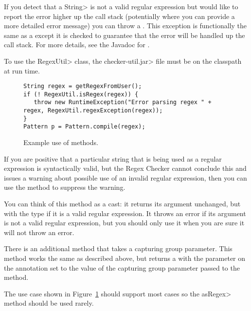 \begin{sloppypar}
If you detect that a \<String> is not a valid regular expression but would like
to report the error higher up the call stack (potentially where you can
provide a more detailed error message) you can throw a
. This exception is
functionally the same as a
except it is checked to guarantee that the error will be handled up the
call stack.  For more details, see the Javadoc for
.
\end{sloppypar}

To use the \<RegexUtil> class, the \<checker-util.jar> file
must be on the classpath at run time.

\begin{figure}
\begin{smaller}
\begin{Verbatim}
String regex = getRegexFromUser();
if (! RegexUtil.isRegex(regex)) {
   throw new RuntimeException("Error parsing regex " + regex, RegexUtil.regexException(regex));
}
Pattern p = Pattern.compile(regex);
\end{Verbatim}
\end{smaller}
\caption{Example use of  methods.}
\label{fig-regex-util-example}
\end{figure}


If you are positive that a particular string that is being used as a
regular expression is syntactically valid, but the Regex Checker cannot
conclude this and issues a warning about possible use of an invalid regular
expression, then you can use the
 method to suppress the
warning.

You can think of this method
as a cast:  it returns its argument unchanged, but with the type
 if it is a valid regular expression.  It throws an
error if its argument is not a valid regular expression, but you should
only use it when you are sure it will not throw an error.

There is an additional 
method that takes a capturing group parameter. This method works the same as
described above, but returns a  with the parameter on the
annotation set to the value of the capturing group parameter passed to the method.

The use case shown in Figure~\ref{fig-regex-util-example} should support most cases
so the \<asRegex> method should be used rarely.




